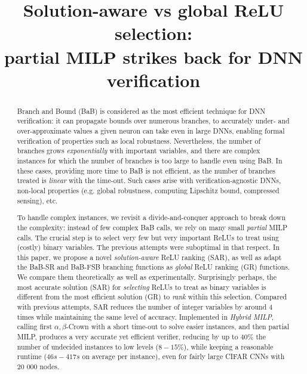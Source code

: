 \documentclass{llncs}
\title{Solution-aware vs global ReLU selection: \\
partial MILP strikes back for DNN verification}
\date{}
\begin{document}
	
	\maketitle
	
	\begin{abstract}
		Branch and Bound (BaB) is considered as the most efficient technique for DNN verification: it can propagate bounds over numerous branches, to accurately under- and over-approximate values a given neuron can take even in large DNNs, enabling formal verification of properties such as local robustness. Nevertheless, the number of branches grows {\em exponentially} with important variables, and there are complex instances for which the number of branches is too large to handle even using BaB. In these cases, providing more time to BaB is not efficient, as the number of branches treated is {\em linear} with the time-out. Such cases arise with verification-agnostic DNNs, non-local properties (e.g. global robustness, computing Lipschitz bound, compressed sensing), etc. 
				
        To handle complex instances, we revisit a divide-and-conquer approach to break down the complexity: instead of few complex BaB calls, we rely on many small {\em partial} MILP calls. The crucial step is to select very few but very important ReLUs to treat using (costly) binary variables. The previous attempts were suboptimal in that respect. In this paper, we propose a novel {\em solution-aware} ReLU ranking (SAR), as well as adapt the BaB-SR and BaB-FSB branching functions as {\em global} ReLU ranking (GR) functions. We compare them theoretically as well as experimentally. Surprisingly perhaps, the most accurate solution (SAR) for {\em selecting} ReLUs to treat as binary variables is different from the most efficient solution (GR) to {\em rank} within this selection. Compared with previous attempts, SAR reduces the number of integer variables by around 4 times while maintaining the same level of accuracy. Implemented in {\em Hybrid MILP}, calling first $\alpha,\beta$-Crown with a short time-out to solve easier instances, and then partial MILP, produces a very accurate yet efficient verifier, reducing by up to $40\%$ the number of undecided instances to low levels ($8-15\%$), while keeping a reasonable runtime ($46s-417s$ on average per instance), even for fairly large CIFAR CNNs with 20 000 nodes.


\end{abstract}
\end{document}
